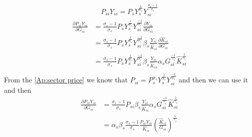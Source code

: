 \begin{gather*}
    P_{si}Y_{si} = P_s{Y}_s^{\frac{1}{\sigma_s}}Y_{si}^{\frac{\sigma_s-1}{\sigma_s}}
\end{gather*}
\begin{equation*}
    \begin{split}
        \frac{\partial P_{si}Y_{si} }{\partial G_{si}}  & = 
        \frac{\sigma_s-1}{\sigma_s}P_s{Y}_s^{\frac{1}{\sigma_s}}Y_{si}^{\frac{-1}{\sigma_s}}\frac{\partial Y_{si}}{\partial G_{si}}\\
        & = \frac{\sigma_s-1}{\sigma_s}P_s{Y}_s^{\frac{1}{\sigma_s}}Y_{si}^{\frac{-1}{\sigma_s}} \beta_s \frac{Y_{si}}{\hat{K}_{si}}\frac{\partial \hat{K}_{si}}{\partial G_{si}}\\
        & = \frac{\sigma_s-1}{\sigma_s}P_s{Y}_s^{\frac{1}{\sigma_s}}Y_{si}^{\frac{-1}{\sigma_s}} \beta_s \frac{Y_{si}}{\hat{K}_{si}}\alpha_s G_{si}^{\frac{-1}{\gamma_s}} \hat{K}_{si}^{\frac{1}{\gamma_s}}\\
    \end{split}
\end{equation*}
From the \ref{Ap:sector price} we know that $P_{si} = P_s^{\sigma_s}Y_s^{\frac{1}{\sigma_s}}Y_{si}^{\frac{-1}{\sigma_s}}$ and then we can use it and then
\begin{equation*}
    \begin{split}
        \frac{\partial P_{si}Y_{si} }{\partial G_{si}} & = \frac{\sigma_s-1}{\sigma_s}P_{si} \beta_s \frac{Y_{si}}{\hat{K}_{si}}\alpha_s G_{si}^{\frac{-1}{\gamma_s}} \hat{K}_{si}^{\frac{1}{\gamma_s}}\\
        & = \alpha_s \beta_s  \frac{\sigma_s-1}{\sigma_s} \frac{P_{si}Y_{si}}{\hat{K}_{si}}(\frac{\hat{K}_{si}}{G_{si}})^{\frac{1}{\gamma_s}}
    \end{split}
\end{equation*}